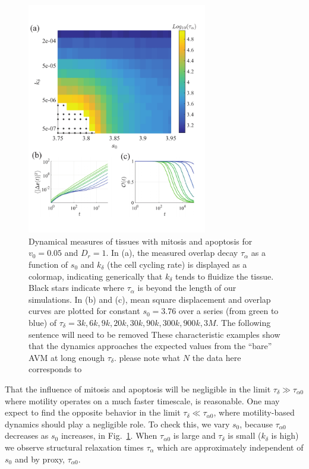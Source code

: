 \documentclass[
reprint
,aps
,amssymb
,amsmath
,superscriptaddress
]{revtex4-1}
\newcommand{\mdc}[1]{{\color{blue}#1}}
\newcommand{\dms}[1]{{\color{magenta}#1}}
\begin{document}
\begin{figure}[!t]  
\begin{center}
    \includegraphics[width=0.7\textwidth]{manuscript_images_dd_tissue_rheology.pdf}
    \caption{\label{fig:dd_rheology} Dynamical measures of tissues with mitosis and apoptosis for $v_0=0.05$ and $D_r=1$. In (a), the measured overlap decay $\tau_\alpha$ as a function of $s_0$ and $k_\delta$ (the cell cycling rate) is displayed as a colormap, indicating generically that $k_\delta$ tends to fluidize the tissue.  Black stars indicate where \mdc{$\tau_\alpha$ is beyond the length of our simulations}. In (b) and (c), mean square displacement and overlap curves are plotted for constant $s_0=3.76$ over a series (from green to blue) of $\tau_\delta = 3k, 6k, 9k, 20k, 30k, 90k, 300k, 900k, 3M$. \mdc{The following sentence will need to be removed} These characteristic examples show that the dynamics approaches the expected values from the ``bare'' AVM at long enough $\tau_\delta$. \dms{please note what $N$ the data here corresponds to}%
    }
    \end{center}
\end{figure}

That the influence of mitosis and apoptosis will be negligible in the limit $\tau_\delta \gg \tau_{\alpha0}$ where motility operates on a much faster timescale, is reasonable. One may expect to find the opposite behavior in the limit $\tau_\delta \ll \tau_{\alpha0}$, where motility-based dynamics should play a negligible role. To check this, we vary $s_0$, because  $\tau_{\alpha0}$ decreases as $s_0$ increases, in Fig.~\ref{fig:dd_rheology}. When $\tau_{\alpha0}$ is large and $\tau_\delta$ is small ($k_\delta$ is high) we observe structural relaxation times $\tau_\alpha$ which are approximately independent of $s_0$ and by proxy, $\tau_{\alpha0}$. 
\end{document}
